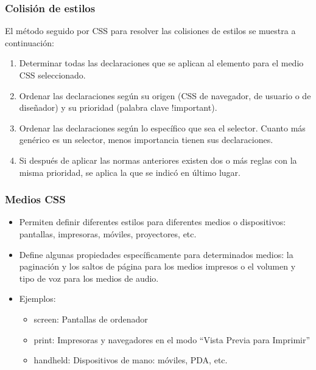 \begin{frame}
\frametitle{Colisión de estilos}

El método seguido por CSS para resolver las colisiones de estilos se muestra a continuación:

\begin{enumerate}
  \item Determinar todas las declaraciones que se aplican al elemento para el medio CSS seleccionado.
  \item Ordenar las declaraciones según su origen (CSS de navegador, de usuario o de diseñador) y su prioridad (palabra clave !important).
  \item Ordenar las declaraciones según lo específico que sea el selector. Cuanto más genérico es un selector, menos importancia tienen sus declaraciones.
  \item Si después de aplicar las normas anteriores existen dos o más reglas con la misma prioridad, se aplica la que se indicó en último lugar.
\end{enumerate}

\end{frame}




\begin{frame}
\frametitle{Medios CSS}

\begin{itemize}
  \item Permiten definir diferentes estilos para diferentes medios o dispositivos: pantallas, impresoras, móviles, proyectores, etc.
  \item Define algunas propiedades específicamente para determinados medios: la paginación y los saltos de página para los medios impresos o el volumen y tipo de voz para los medios de audio.
  \item Ejemplos:
  \begin{itemize}
    \item screen: Pantallas de ordenador
    \item print: Impresoras y navegadores en el modo ``Vista Previa para Imprimir''
    \item handheld:	Dispositivos de mano: móviles, PDA, etc.
  \end{itemize}
\end{itemize}

\end{frame}

